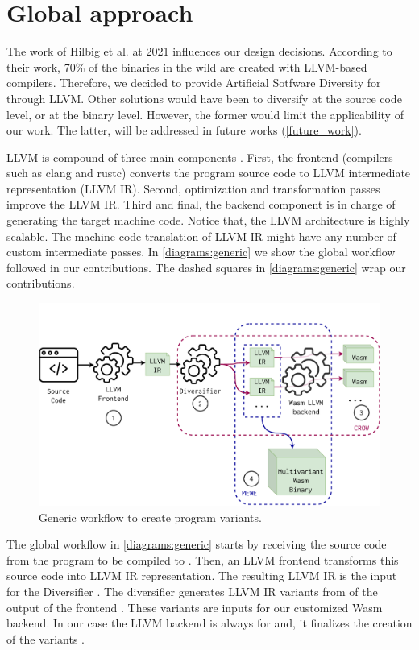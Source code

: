 \section{Global approach}
\label{tech:generic}

The work of Hilbig et al. \cite{Hilbig2021AnES} at 2021 influences our design decisions. According to their work, 70\% of the \wasm binaries in the wild are created with LLVM-based compilers. Therefore, we decided to provide Artificial Sotfware Diversity for \wasm through LLVM. 
Other solutions would have been to diversify at the source code level, or at the \wasm binary level. However, the former would limit the applicability of our work. The latter, will be addressed in future works (\autoref{future_work}).

LLVM is compound of three main components \citationneeded. First, the frontend (compilers such as clang and rustc) converts the program source code to LLVM intermediate representation (LLVM IR). Second, optimization and transformation passes improve the LLVM IR. Third and final, the backend component is in charge of generating the target machine code. Notice that, the LLVM architecture is highly scalable. The machine code translation of LLVM IR might have any number of custom intermediate passes. In \autoref{diagrams:generic} we show the global workflow followed in our contributions. 
The dashed squares in \autoref{diagrams:generic} wrap our contributions.

\begin{figure}[h]
    \includegraphics[width=\linewidth]{diagrams/architecture.pdf}
    \caption{Generic workflow to create \wasm program variants.}
    \label{diagrams:generic}
\end{figure}


The global workflow in \autoref{diagrams:generic} starts by receiving the source code from the program to be compiled to \wasm. Then, an LLVM frontend transforms this source code into LLVM IR representation. The resulting LLVM IR is the input for the Diversifier .  
The diversifier generates LLVM IR variants from of the output of the frontend . These variants are inputs for our customized Wasm  backend. In our case the LLVM backend is always for \wasm and, it finalizes the creation of the variants . 


